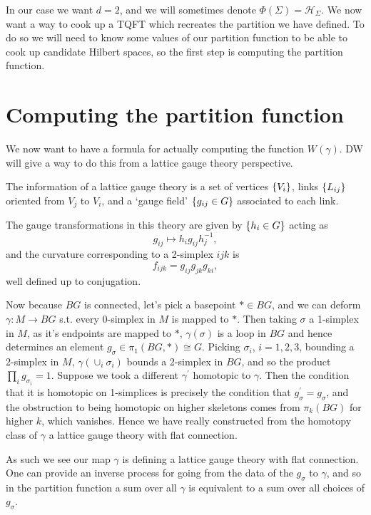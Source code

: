 \documentclass{article}
\begin{document}
In our case we want $d=2$, and we will sometimes denote $\Phi(\Sigma) = \mathcal{H}_\Sigma$. We now want a way to cook up a TQFT which recreates the partition we have defined. To do so we will need to know some values of our partition function to be able to cook up candidate Hilbert spaces, so the first step is computing the partition function.  

\section{Computing the partition function}
We now want to have a formula for actually computing the function $W(\gamma)$. DW will give a way to do this from a lattice gauge theory perspective. 


\begin{definition}[DW LGT]
	The information of a lattice gauge theory is a set of vertices $\left\{ V_i \right\}$, links $\left\{ L_{ij} \right\}$ oriented from $V_j$ to $V_i$, and a `gauge field' $\left\{ g_{ij}\in G \right\}$ associated to each link.
	
	The gauge transformations in this theory are given by $\left\{ h_i \in G \right\}$ acting as 
	\[
	g_{ij} \mapsto h_i g_{ij} h_j^{-1},
	\]
	and the curvature corresponding to a 2-simplex $ijk$ is 
	\[
	f_{ijk} = g_{ij} g_{jk} g_{ki},
	\]
	well defined up to conjugation. 
\end{definition}

Now because $BG$ is connected, let's pick a basepoint $\ast \in BG$, and we can deform $\gamma : M \to BG$ s.t. every 0-simplex in $M$ is mapped to $\ast$. Then taking $\sigma$ a 1-simplex in $M$, as it's endpoints are mapped to $\ast$, $\gamma(\sigma)$ is a loop in $BG$ and hence determines an element  $g_\sigma \in  \pi_1(BG, \ast) \cong G$. Picking $\sigma_i$, $i=1,2,3$, bounding a 2-simplex in $M$, $\gamma(\cup_i \sigma_i)$ bounds a 2-simplex in $BG$, and so the product $\prod_i g_{\sigma_i} = 1$. Suppose we took a different $\gamma^\prime$ homotopic to $\gamma$. Then the condition that it is homotopic on 1-simplices is precisely the condition that $g_\sigma^\prime = g_\sigma$, and the obstruction to being homotopic on higher skeletons comes from $\pi_k(BG)$ for higher $k$, which vanishes. Hence we have really constructed from the homotopy class of $\gamma$ a lattice gauge theory with flat connection. 

As such we see our map $\gamma$ is defining a lattice gauge theory with flat connection. One can provide an inverse process for going from the data of the $g_\sigma$ to $\gamma$, and so in the partition function a sum over all $\gamma$ is equivalent to a sum over all choices of $g_\sigma$.  
 
\end{document}
